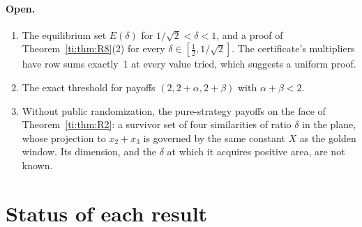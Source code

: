 \documentclass[11pt]{amsart}
\theoremstyle{remark}
\begin{document}
\paragraph{Open.}
\begin{enumerate}
\item The equilibrium set $E(\delta)$ for $1/\sqrt2<\delta<1$, and a proof of
  Theorem~\ref{ti:thm:R8}(2) for every $\delta\in[\frac12,1/\sqrt2]$. The certificate's multipliers
  have row sums exactly~1 at every value tried, which suggests a uniform proof.
\item The exact threshold for payoffs $(2,2+\alpha,2+\beta)$ with $\alpha+\beta<2$.
\item Without public randomization, the pure-strategy payoffs on the face of
  Theorem~\ref{ti:thm:R2}: a survivor set of four similarities of ratio $\delta$ in the plane, whose
  projection to $x_2+x_3$ is governed by the same constant $X$ as the golden window. Its dimension,
  and the $\delta$ at which it acquires positive area, are not known.
\end{enumerate}

\section{Status of each result}\label{sec:status}
\end{document}
